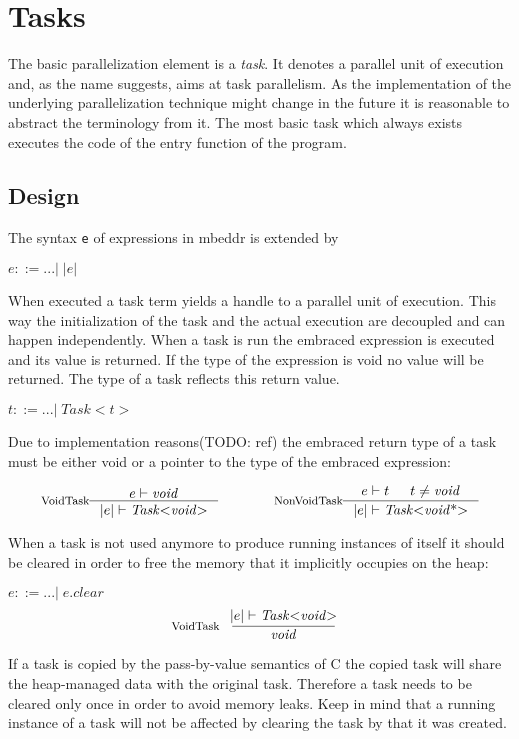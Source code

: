 \section{Tasks}
The basic parallelization element is a \textit{task}. It denotes a parallel unit of execution and, as the name suggests, aims at task parallelism. As the implementation of the underlying parallelization technique might change in the future it is reasonable to abstract the terminology from it. The most basic task which always exists executes the code of the entry function of the program.
\subsection{Design}
The syntax \texttt{e} of expressions in mbeddr is extended by

$e ::= ...|\;\mathit{|e|}$

When executed a task term yields a handle to a parallel unit of execution. This way the initialization of the task and the actual execution are decoupled and can happen independently. When a task is run the embraced expression is executed and its value is returned. If the type of the expression is void no value will be returned. The type of a task reflects this return value.

$t ::= ... |\;\mathit{Task{<}t{>}}$

Due to implementation reasons(TODO: ref) the embraced return type of a task must be either void or a pointer to the type of the embraced expression:

\begin{align*}
\inference*[VoidTask]{e |- \mathit{void}}{|e| |- \mathit{Task{<}void{>}}} 
\qquad\qquad
\inference*[NonVoidTask]{e |- t & t \neq \mathit{void}}{|e| |- \mathit{Task{<}void{\text{*}}{>}}}
\end{align*}

When a task is not used anymore to produce running instances of itself it should be cleared in order to free the memory that it implicitly occupies on the heap:

$e ::= ...|\;e.\mathit{clear}$
\begin{align*}
\inference*[VoidTask]{|e| |- \mathit{Task{<}void{>}}}{\qquad\mathit{void}\qquad} 
\end{align*}

If a task is copied by the pass-by-value semantics of C the copied task will share the heap-managed data with the original task. Therefore a task needs to be cleared only once in order to avoid memory leaks. Keep in mind that a running instance of a task will not be affected by clearing the task by that it was created.

